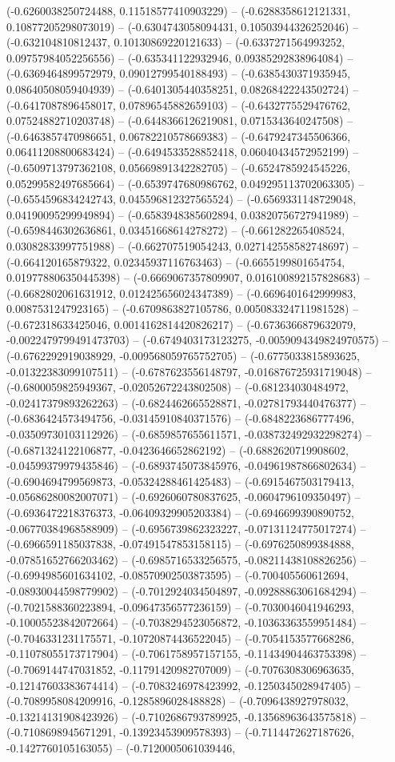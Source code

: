 	(-0.6260038250724488, 0.11518577410903229) -- (-0.6288358612121331, 0.10877205298073019) -- (-0.6304743058094431, 0.10503944326252046) -- (-0.632104810812437, 0.10130869220121633) -- (-0.6337271564993252, 0.09757984052256556) -- (-0.635341122932946, 0.09385292838964084) -- (-0.6369464899572979, 0.09012799540188493) -- (-0.6385430371935945, 0.08640508059404939) -- (-0.6401305440358251, 0.08268422243502724) -- (-0.6417087896458017, 0.07896545882659103) -- (-0.6432775529476762, 0.07524882710203748) -- (-0.6448366126219081, 0.0715343640247508) -- (-0.6463857470986651, 0.06782210578669383) -- (-0.6479247345506366, 0.06411208800683424) -- (-0.6494533528852418, 0.06040434572952199) -- (-0.6509713797362108, 0.05669891342282705) -- (-0.6524785924545226, 0.05299582497685664) -- (-0.6539747680986762, 0.049295113702063305) -- (-0.6554596834242743, 0.045596812327565524) -- (-0.6569331148729048, 0.04190095299949894) -- (-0.6583948385602894, 0.03820756727941989) -- (-0.6598446302636861, 0.03451668614278272) -- (-0.661282265408524, 0.03082833997751988) -- (-0.662707519054243, 0.027142558582748697) -- (-0.664120165879322, 0.02345937116763463) -- (-0.6655199801654754, 0.019778806350445398) -- (-0.6669067357809907, 0.016100892157828683) -- (-0.6682802061631912, 0.012425656024347389) -- (-0.6696401642999983, 0.0087531247923165) -- (-0.6709863827105786, 0.005083324711981528) -- (-0.672318633425046, 0.0014162814420826217) -- (-0.6736366879632079, -0.0022479799491473703) -- (-0.6749403173123275, -0.0059094349824970575) -- (-0.6762292919038929, -0.009568059765752705) -- (-0.6775033815893625, -0.01322383099107511) -- (-0.6787623556148797, -0.016876725931719048) -- (-0.6800059825949367, -0.02052672243802508) -- (-0.681234030484972, -0.02417379893262263) -- (-0.6824462665528871, -0.02781793440476377) -- (-0.6836424573494756, -0.03145910840371576) -- (-0.6848223686777496, -0.03509730103112926) -- (-0.6859857655611571, -0.038732492932298274) -- (-0.6871324122106877, -0.0423646652862192) -- (-0.6882620719908602, -0.04599379979435846) -- (-0.6893745073845976, -0.04961987866802634) -- (-0.6904694799569873, -0.05324288461425483) -- (-0.6915467503179413, -0.05686280082007071) -- (-0.6926060780837625, -0.0604796109350497) -- (-0.6936472218376373, -0.06409329905203384) -- (-0.6946699390890752, -0.06770384968588909) -- (-0.6956739862323227, -0.07131124775017274) -- (-0.6966591185037838, -0.07491547853158115) -- (-0.6976250899384888, -0.07851652766203462) -- (-0.6985716533256575, -0.08211438108826256) -- (-0.6994985601634102, -0.08570902503873595) -- (-0.700405560612694, -0.08930044598779902) -- (-0.7012924034504897, -0.09288863061684294) -- (-0.7021588360223894, -0.09647356577236159) -- (-0.7030046041946293, -0.10005523842072664) -- (-0.7038294523056872, -0.10363363559951484) -- (-0.7046331231175571, -0.10720874436522045) -- (-0.7054153577668286, -0.11078055173717904) -- (-0.7061758957157155, -0.11434904463753398) -- (-0.7069144747031852, -0.11791420982707009) -- (-0.7076308306963635, -0.12147603383674414) -- (-0.7083246978423992, -0.1250345028947405) -- (-0.7089958084209916, -0.1285896028488828) -- (-0.7096438927978032, -0.13214131908423926) -- (-0.7102686793789925, -0.13568963643575818) -- (-0.7108698945671291, -0.13923453909578393) -- (-0.7114472627187626, -0.1427760105163055) -- (-0.7120005061039446, 